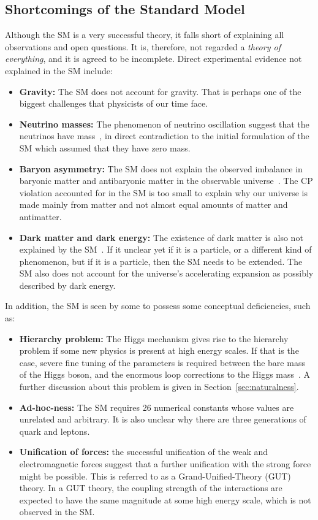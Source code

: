 \subsection{Shortcomings of the Standard Model}

Although the SM is a very successful theory, it falls short of explaining all observations and open questions. It is, therefore, not regarded a \emph{theory of everything}, and it is agreed to be incomplete. Direct experimental evidence not explained in the SM include:
\begin{itemize}
\item \textbf{Gravity:} The SM does not account for gravity. That is perhaps one of the biggest challenges that physicists of our time face.
\item \textbf{Neutrino masses:} The phenomenon of neutrino oscillation suggest that the neutrinos have mass~\cite{Gonzalez_Garcia_2008}, in direct contradiction to the initial formulation of the SM which assumed that they have zero mass.
\item \textbf{Baryon asymmetry:} The SM does not explain the observed imbalance in baryonic matter and antibaryonic matter in the observable universe~\cite{Canetti_2012}. The CP violation accounted for in the SM is too small to explain why our universe is made mainly from matter and not almost equal amounts of matter and antimatter.
\item \textbf{Dark matter and dark energy:} The existence of dark matter is also not explained by the SM~\cite{Garrett_2011}. If it unclear yet if it is a particle, or a different kind of phenomenon, but if it is a particle, then the SM needs to be extended. The SM also does not account for the  universe's accelerating expansion as possibly described by dark energy.
\end{itemize}

In addition, the SM is seen by some to possess some conceptual deficiencies, such as:
\begin{itemize}
\item \textbf{Hierarchy problem:} The Higgs mechanism gives rise to the hierarchy problem if some new physics is present at high energy scales. If that is the case, severe fine tuning of the parameters is required between the bare mass of the Higgs boson, and the enormous loop corrections to the Higgs mass~\cite{Jegerlehner_2014}. A further discussion about this problem is given in Section~\ref{sec:naturalness}.
\item \textbf{Ad-hoc-ness:} The SM requires 26 numerical constants whose values are unrelated and arbitrary. It is also unclear why there are three generations of quark and leptons.
\item \textbf{Unification of forces:} the successful unification of the weak and electromagnetic forces suggest that a further unification with the strong force might be possible. This is referred to as a Grand-Unified-Theory (GUT) theory. In a GUT theory, the coupling strength of the interactions are expected to have the same magnitude at some high energy scale, which is not observed in the SM.
\end{itemize}

